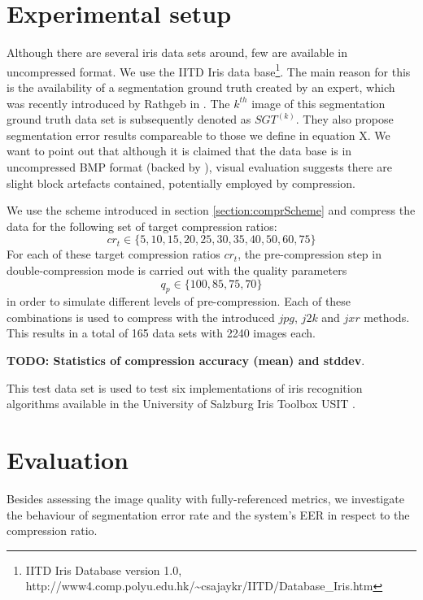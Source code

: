 \documentclass[10pt,twocolumn,letterpaper]{article}
\begin{document}
\section{Experimental setup}
Although there are several iris data sets around, few are available in uncompressed format. We use the IITD Iris data base\footnote{IITD Iris Database version 1.0, http://www4.comp.polyu.edu.hk/\textasciitilde csajaykr/IITD/Database\_Iris.htm}. The main reason for this is the availability of a segmentation ground truth created by an expert, which was recently introduced by Rathgeb \etal in \cite{severeCompression}. The $k^{th}$ image of this segmentation ground truth data set is subsequently denoted as $SGT^{(k)}$. They also propose segmentation error results compareable to those we define in equation X.
We want to point out that although it is claimed that the data base is in uncompressed BMP format (backed by \cite{severeCompression}), visual evaluation suggests there are slight block artefacts contained, potentially employed by compression. %

We use the scheme introduced in section \ref{section:comprScheme} and compress the data for the following set of target compression ratios:
\begin{equation}
cr_t \in \{5,10,15,20,25,30,35,40,50,60,75\}
\end{equation}
For each of these target compression ratios $cr_t$, the pre-compression step in double-compression mode is carried out with the quality parameters
\begin{equation}
q_p \in \{100, 85, 75, 70\}
\end{equation} 
in order to simulate different levels of pre-compression. Each of these combinations is used to compress with the introduced $jpg$, $j2k$ and $jxr$ methods. This results in a total of 165 data sets with 2240 images each.

\textbf{TODO: Statistics of compression accuracy (mean) and stddev}.

This test data set is used to test six implementations of iris recognition algorithms available in the University of Salzburg Iris Toolbox USIT \cite{rathgeb}. 



\section{Evaluation}
 Besides assessing the image quality with fully-referenced metrics, we investigate the behaviour of segmentation error rate and the system's EER in respect to the compression ratio.
\end{document}

